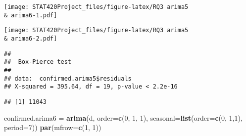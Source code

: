 \documentclass[]{article}
\newenvironment{Shaded}{\begin{snugshade}}{\end{snugshade}}
\newcommand{\DataTypeTok}[1]{\textcolor[rgb]{0.13,0.29,0.53}{#1}}
\newcommand{\DecValTok}[1]{\textcolor[rgb]{0.00,0.00,0.81}{#1}}
\newcommand{\KeywordTok}[1]{\textcolor[rgb]{0.13,0.29,0.53}{\textbf{#1}}}
\newcommand{\NormalTok}[1]{#1}
\newcommand{\OperatorTok}[1]{\textcolor[rgb]{0.81,0.36,0.00}{\textbf{#1}}}
\newcommand{\StringTok}[1]{\textcolor[rgb]{0.31,0.60,0.02}{#1}}
\begin{document}
\texttt{[image: STAT420Project\_files/figure-latex/RQ3 arima5 \\\& arima6-1.pdf]}

\begin{Shaded}
\end{Shaded}

\texttt{[image: STAT420Project\_files/figure-latex/RQ3 arima5 \\\& arima6-2.pdf]}

\begin{Shaded}
\end{Shaded}

\begin{verbatim}
## 
##  Box-Pierce test
## 
## data:  confirmed.arima5$residuals
## X-squared = 395.64, df = 19, p-value < 2.2e-16
\end{verbatim}

\begin{Shaded}
\end{Shaded}

\begin{verbatim}
## [1] 11043
\end{verbatim}

\begin{Shaded}
\begin{Highlighting}[]
\NormalTok{confirmed.arima6 =}\StringTok{ }\KeywordTok{arima}\NormalTok{(d, }\DataTypeTok{order=}\KeywordTok{c}\NormalTok{(}\DecValTok{0}\NormalTok{, }\DecValTok{1}\NormalTok{, }\DecValTok{1}\NormalTok{),  }\DataTypeTok{seasonal=}\KeywordTok{list}\NormalTok{(}\DataTypeTok{order=}\KeywordTok{c}\NormalTok{(}\DecValTok{0}\NormalTok{, }\DecValTok{1}\NormalTok{,}\DecValTok{1}\NormalTok{), }\DataTypeTok{period=}\DecValTok{7}\NormalTok{))}
\KeywordTok{par}\NormalTok{(}\DataTypeTok{mfrow=}\KeywordTok{c}\NormalTok{(}\DecValTok{1}\NormalTok{, }\DecValTok{1}\NormalTok{))}
\end{Highlighting}
\end{Shaded}
\end{document}
